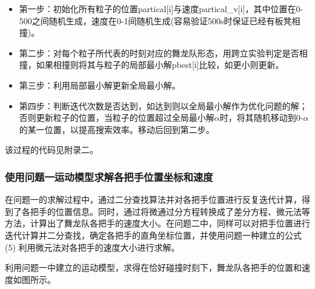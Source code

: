 \documentclass[a4paper]{article}
\begin{document}
        \begin{itemize}
            \item 第一步：初始化所有粒子的位置partical[i]与速度partical\_v[i]，其中位置在0-500之间随机生成，速度在0-1间随机生成(容易验证500s时保证已经有板凳相撞)。
            \item 第二步：对每个粒子所代表的时刻对应的舞龙队形态，用跨立实验判定是否相撞，如果相撞则将其与粒子的局部最小解pbest[i]比较，如更小则更新。
            \item 第三步：利用局部最小解更新全局最小解。
            \item 第四步：判断迭代次数是否达到，如达到则以全局最小解作为优化问题的解；否则更新粒子的位置，当粒子的位置超过全局最小解$\alpha$时，将其随机移动到0-$\alpha$的某一位置，以提高搜索效率。移动后回到第二步。
        \end{itemize}
该过程的代码见附录二。
        \subsubsection{使用问题一运动模型求解各把手位置坐标和速度}
        
        在问题一的求解过程中，通过二分查找算法并对各把手位置进行反复迭代计算，得到了各把手的位置信息。同时，通过将微通过分方程转换成了差分方程、微元法等方法，计算出了舞龙队各把手的速度大小。在问题二中，同样可以对把手位置进行迭代计算并二分查找，确定各把手的直角坐标位置，并使用问题一种建立的公式 (5) 利用微元法对各把手的速度大小进行求解。
        
        利用问题一中建立的运动模型，求得在恰好碰撞时刻下，舞龙队各把手的位置和速度如图所示。
        
\end{document}
